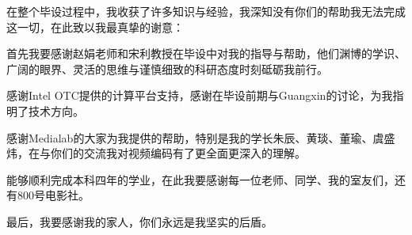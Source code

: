 

\begin{acknowledgements}
  在整个毕设过程中，我收获了许多知识与经验，我深知没有你们的帮助我无法完成这一切，在此致以我最真挚的谢意：

  首先我要感谢赵娟老师和宋利教授在毕设中对我的指导与帮助，他们渊博的学识、广阔的眼界、灵活的思维与谨慎细致的科研态度时刻砥砺我前行。

  感谢Intel OTC提供的计算平台支持，感谢在毕设前期与Guangxin的讨论，为我指明了技术方向。

  感谢Medialab的大家为我提供的帮助，特别是我的学长朱辰、黄琰、董瑜、虞盛炜，在与你们的交流我对视频编码有了更全面更深入的理解。

  能够顺利完成本科四年的学业，在此我要感谢每一位老师、同学、我的室友们，还有800号电影社。

  最后，我要感谢我的家人，你们永远是我坚实的后盾。

\end{acknowledgements}

